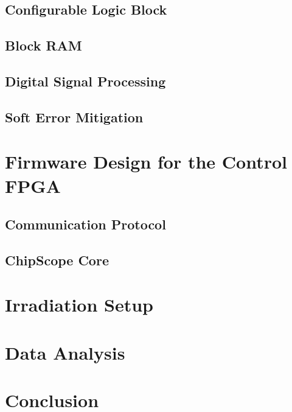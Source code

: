     \subsection{Configurable Logic Block}

    \subsection{Block RAM}

    \subsection{Digital Signal Processing}

    \subsection{Soft Error Mitigation}

  \section{Firmware Design for the Control FPGA}

    \subsection{Communication Protocol}

    \subsection{ChipScope Core}

  \section{Irradiation Setup}

  \section{Data Analysis}

  \section{Conclusion}
